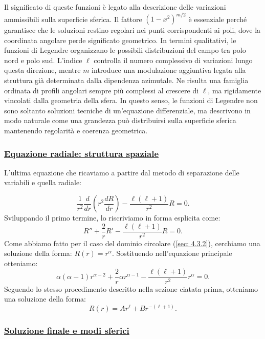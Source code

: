 \documentclass[a4paper,12pt]{report}
\begin{document}
Il significato di queste funzioni è legato alla descrizione delle variazioni ammissibili sulla superficie sferica. Il fattore $(1-x^2)^{m/2}$ è essenziale perché garantisce che le soluzioni restino regolari nei punti corrispondenti ai poli, dove la coordinata angolare perde significato geometrico. In termini qualitativi, le funzioni di Legendre organizzano le possibili distribuzioni del campo tra polo nord e polo sud. L’indice $\ell$ controlla il numero complessivo di variazioni lungo questa direzione, mentre $m$ introduce una modulazione aggiuntiva legata alla struttura già determinata dalla dipendenza azimutale. Ne risulta una famiglia ordinata di profili angolari sempre più complessi al crescere di $\ell$, ma rigidamente vincolati dalla geometria della sfera. In questo senso, le funzioni di Legendre non sono soltanto soluzioni tecniche di un’equazione differenziale, ma descrivono in modo naturale come una grandezza può distribuirsi sulla superficie sferica mantenendo regolarità e coerenza geometrica.

\subsubsection{\underline{Equazione radiale: struttura spaziale}}

L'ultima equazione che ricaviamo a partire dal metodo di separazione delle variabili e quella radiale:

\[
\frac{1}{r^2}\frac{d}{dr}\left(r^2 \frac{dR}{dr}\right)
- \frac{\ell(\ell+1)}{r^2}R = 0.
\]
Sviluppando il primo termine, lo riscriviamo in forma esplicita come:
\[
R'' + \frac{2}{r}R' - \frac{\ell(\ell+1)}{r^2}R = 0.
\]
Come abbiamo fatto per il caso del dominio circolare (\ref{sec: 4.3.2}), cerchiamo una soluzione della forma: $R(r)=r^\alpha$. Sostituendo nell’equazione principale otteniamo:
\[
\alpha(\alpha-1)r^{\alpha-2} + \frac{2}{r}\alpha r^{\alpha-1}
- \frac{\ell(\ell+1)}{r^2}r^\alpha = 0.
\]
Seguendo lo stesso procedimento descritto nella sezione ciatata prima, otteniamo una soluzione della forma:
\[
R(r)=A r^\ell + B r^{-(\ell+1)}.
\]

\subsubsection{\underline{Soluzione finale e modi sferici}}
\end{document}
